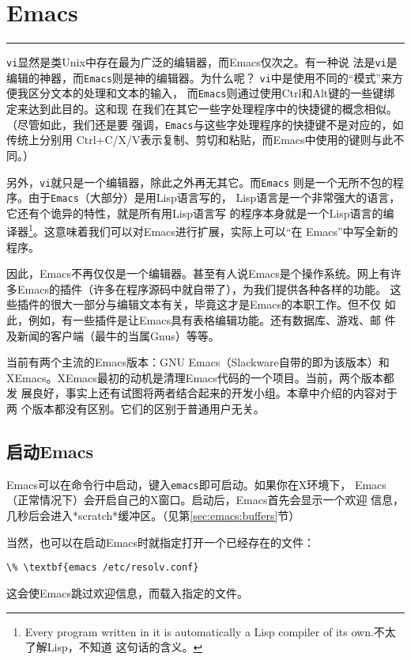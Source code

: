 
\chapter{Emacs}
\label{chap:emacs}

\begin{flushleft}
\rule{\textwidth}{0.1pt}
\end{flushleft}

\texttt{vi}显然是类Unix中存在最为广泛的编辑器，而Emacs仅次之。有一种说
法是\texttt{vi}是编辑的神器，而\texttt{Emacs}则是神的编辑器。为什么呢？
\texttt{vi}中是使用不同的``模式''来方便我区分文本的处理和文本的输入，
而\texttt{Emacs}则通过使用Ctrl和Alt键的一些键绑定来达到此目的。这和现
在我们在其它一些字处理程序中的快捷键的概念相似。（尽管如此，我们还是要
强调，\texttt{Emacs}与这些字处理程序的快捷键不是对应的，如传统上分别用
Ctrl+C/X/V表示复制、剪切和粘贴，而Emacs中使用的键则与此不同。）

另外，\texttt{vi}就只是一个编辑器，除此之外再无其它。而\texttt{Emacs}
则是一个无所不包的程序。由于\texttt{Emacs}（大部分）是用Lisp语言写的，
Lisp语言是一个非常强大的语言，它还有个诡异的特性，就是所有用Lisp语言写
的程序本身就是一个Lisp语言的编译器\footnote{Every program written in
  it is automatically a Lisp compiler of its own.不太了解Lisp，不知道
  这句话的含义。}。这意味着我们可以对Emacs进行扩展，实际上可以``在
Emacs''中写全新的程序。

因此，Emacs不再仅仅是一个编辑器。甚至有人说Emacs是个操作系统。网上有许
多Emacs的插件（许多在程序源码中就自带了），为我们提供各种各样的功能。
这些插件的很大一部分与编辑文本有关，毕竟这才是Emacs的本职工作。但不仅
如此，例如，有一些插件是让Emacs具有表格编辑功能。还有数据库、游戏、邮
件及新闻的客户端（最牛的当属Gnus）等等。

当前有两个主流的Emacs版本：GNU Emacs（Slackware自带的即为该版本）和
XEmacs。XEmacs最初的动机是清理Emacs代码的一个项目。当前，两个版本都发
展良好，事实上还有试图将两者结合起来的开发小组。本章中介绍的内容对于两
个版本都没有区别。它们的区别于普通用户无关。

\section{启动Emacs}
\label{sec:emacs:start}
Emacs可以在命令行中启动，键入\texttt{emacs}即可启动。如果你在X环境下，
Emacs（正常情况下）会开启自己的X窗口。启动后，Emacs首先会显示一个欢迎
信息，几秒后会进入*scratch*缓冲区。（见第\ref{sec:emacs:buffers}节）

当然，也可以在启动Emacs时就指定打开一个已经存在的文件：
\begin{Verbatim}[frame=single,commandchars=\\\{\}]
\% \textbf{emacs /etc/resolv.conf}
\end{Verbatim}
这会使Emacs跳过欢迎信息，而载入指定的文件。

